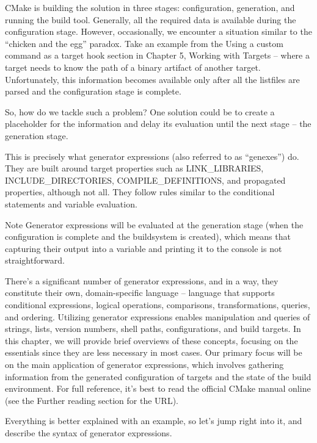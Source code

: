 

CMake is building the solution in three stages: configuration, generation, and running the build tool. Generally, all the required data is available during the configuration stage. However, occasionally, we encounter a situation similar to the “chicken and the egg” paradox. Take an example from the Using a custom command as a target hook section in Chapter 5, Working with Targets – where a target needs to know the path of a binary artifact of another target. Unfortunately, this information becomes available only after all the listfiles are parsed and the configuration stage is complete.

So, how do we tackle such a problem? One solution could be to create a placeholder for the information and delay its evaluation until the next stage – the generation stage.

This is precisely what generator expressions (also referred to as “genexes”) do. They are built around target properties such as LINK\_LIBRARIES, INCLUDE\_DIRECTORIES, COMPILE\_DEFINITIONS, and propagated properties, although not all. They follow rules similar to the conditional statements and variable evaluation.

\begin{myNotic}{Note}
Generator expressions will be evaluated at the generation stage (when the configuration is complete and the buildsystem is created), which means that capturing their output into a variable and printing it to the console is not straightforward.
\end{myNotic}

There’s a significant number of generator expressions, and in a way, they constitute their own, domain-specific language – language that supports conditional expressions, logical operations, comparisons, transformations, queries, and ordering. Utilizing generator expressions enables manipulation and queries of strings, lists, version numbers, shell paths, configurations, and build targets. In this chapter, we will provide brief overviews of these concepts, focusing on the essentials since they are less necessary in most cases. Our primary focus will be on the main application of generator expressions, which involves gathering information from the generated configuration of targets and the state of the build environment. For full reference, it’s best to read the official CMake manual online (see the Further reading section for the URL).

Everything is better explained with an example, so let’s jump right into it, and describe the syntax of generator expressions.















